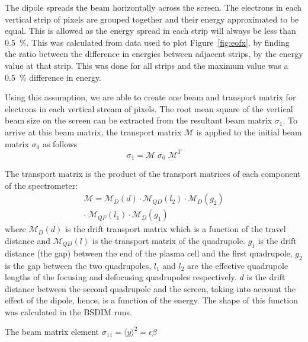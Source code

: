 The dipole spreads the beam horizontally across the screen. The electrons in
each vertical strip of pixels are grouped together and their energy approximated
to be equal. This is allowed as the energy spread in each strip will always be
less than \SI{0.5}{\percent}. This was calculated from data used to plot
Figure~\ref{fig:eofx}, by finding the ratio between the difference in energies
between adjacent strips, by the energy value at that strip. This was done for
all strips and the maximum value was a \SI{0.5}{\percent} difference in energy.

Using this assumption, we are able to create one beam and transport matrix for
electrons in each vertical stream of pixels. The root mean square of the
vertical beam size on the screen can be extracted from the resultant beam matrix
\(\sigma_1\). To arrive at this beam matrix, the transport matrix
\(\mathcal{M}\) is applied to the initial beam matrix \(\sigma_0\) as follows
\begin{equation}
	\sigma_1 = \mathcal{M}\;\sigma_0\;\mathcal{M}^T
\end{equation}

The transport matrix is the product of the transport matrices of each component
of the spectrometer:
\begin{equation}
	\begin{split}
		\mathcal{M} = \mathcal{M}_D(d) \cdot \mathcal{M}_{QD}(l_2) \cdot
		\mathcal{M}_D(g_2) \\
		\cdot\;\mathcal{M}_{QF}(l_1) \cdot \mathcal{M}_D(g_1)
	\end{split}
\end{equation}
where \(\mathcal{M}_D(d)\) is the drift transport matrix which is a function of
the travel distance and \(\mathcal{M}_{QD}(l)\) is the transport matrix of the
quadrupole. \(g_1\) is the drift distance (the gap) between the end of the
plasma cell and the first quadrupole, \(g_2\) is the gap between the two
quadrupoles, \(l_1\) and \(l_2\) are the effective quadrupole lengths of the
focusing and defocusing quadrupoles respectively. \(d\) is the drift distance
between the second quadrupole and the screen, taking into account the effect of
the dipole, hence, is a function of the energy. The shape of this function was
calculated in the BSDIM runs.


The beam matrix element \(\sigma_{11} = \langle y \rangle^2 = \epsilon\beta\)

